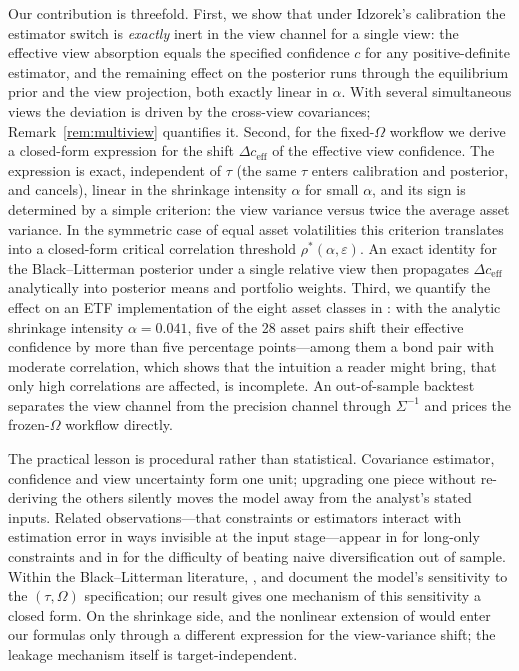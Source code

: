 \documentclass[a4paper,11pt]{article}
\theoremstyle{plain}
\theoremstyle{definition}
\newcommand{\eff}{\mathrm{eff}}
\begin{document}
Our contribution is threefold. First, we show that under Idzorek's
calibration the estimator switch is \emph{exactly} inert in the view
channel for a single view: the effective view absorption equals the
specified confidence $c$ for any positive-definite estimator, and the
remaining effect on the posterior runs through the equilibrium prior and
the view projection, both exactly linear in $\alpha$. With several
simultaneous views the deviation is driven by the cross-view covariances;
Remark~\ref{rem:multiview} quantifies it. Second, for the fixed-$\Omega$
workflow we derive a closed-form expression for the shift
$\Delta c_{\eff}$ of the effective view confidence. The expression is
exact, independent of $\tau$ (the same $\tau$ enters calibration and
posterior, and cancels), linear in the shrinkage intensity $\alpha$ for
small $\alpha$, and its sign is determined by a simple criterion: the view variance versus twice the
average asset variance. In the symmetric case of equal asset volatilities
this criterion translates into a closed-form critical correlation
threshold $\rho^*(\alpha, \varepsilon)$. An exact identity for the
Black--Litterman posterior under a single relative view then propagates
$\Delta c_{\eff}$ analytically into posterior means and portfolio
weights. Third, we quantify the effect on an ETF implementation of the
eight asset classes in \citet{Idzorek2007}: with the analytic shrinkage
intensity $\alpha = 0.041$, five of the 28 asset pairs shift their
effective confidence by more than five percentage points---among them a
bond pair with moderate correlation, which shows that the intuition a
reader might bring, that only high correlations are affected, is
incomplete. An out-of-sample backtest separates the view channel from the
precision channel through $\Sigma^{-1}$ and prices the frozen-$\Omega$
workflow directly.

The practical lesson is procedural rather than statistical. Covariance
estimator, confidence and view uncertainty form one unit; upgrading one
piece without re-deriving the others silently moves the model away from
the analyst's stated inputs. Related observations---that constraints or
estimators interact with estimation error in ways invisible at the input
stage---appear in \citet{JagannathanMa2003} for long-only constraints and
in \citet{DeMiguelGarlappiUppal2009} for the difficulty of beating naive
diversification out of sample. Within the Black--Litterman literature,
\citet{HeLitterman1999}, \citet{SatchellScowcroft2000} and
\citet{Walters2014} document the model's sensitivity to the
$(\tau, \Omega)$ specification; our result gives one mechanism of this
sensitivity a closed form. On the shrinkage side, \citet{LedoitWolf2003}
and the nonlinear extension of \citet{LedoitWolf2017} would enter our
formulas only through a different expression for the view-variance shift;
the leakage mechanism itself is target-independent.
\end{document}
